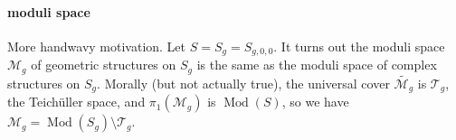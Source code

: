 \documentclass[a4paper]{article}
\DeclareMathOperator{\Mod}{Mod}
\begin{document}
\paragraph{moduli space}

More handwavy motivation. Let \(S = S_g = S_{g, 0, 0}\). It turns out the moduli space \(\mathcal M_g\) of geometric structures on \(S_g\) is the same as the moduli space of complex structures on \(S_g\). Morally (but not actually true), the universal cover \(\tilde{\mathcal M_g}\) is \(\mathcal T_g\), the Teichüller space, and \(\pi_1(\mathcal M_g)\) is \(\Mod(S)\), so we have \(\mathcal M_g = \Mod(S_g) \setminus \mathcal T_g\).





\printindex
\end{document}
